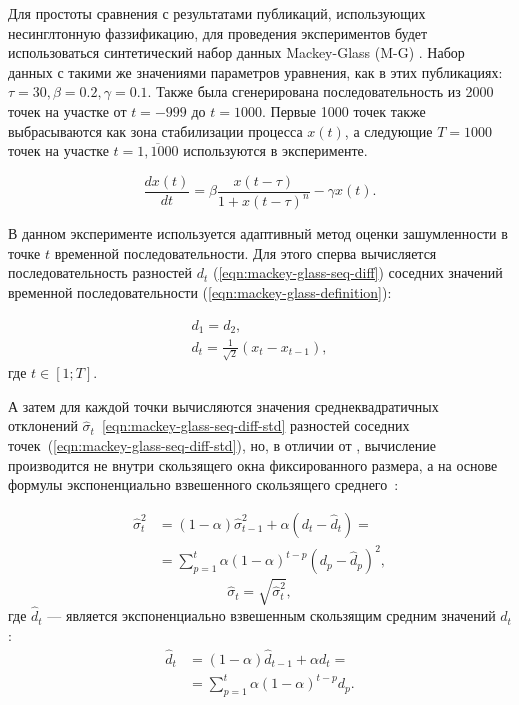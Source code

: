 Для простоты сравнения с результатами публикаций, использующих несинглтонную фаззификацию, для проведения экспериментов будет использоваться синтетический набор данных Mackey-Glass (M-G) \cite{MackeyGlass1977}. Набор данных с такими же значениями параметров уравнения, как в этих публикациях: $\tau = 30, \beta = 0.2, \gamma = 0.1$. Также была сгенерирована последовательность из 2000 точек на участке от $t=-999$ до $t=1000$. Первые 1000 точек также выбрасываются как зона стабилизации процесса $x(t)$, а следующие $T=1000$ точек на участке $t=\overline{1,1000}$ используются в эксперименте.

\begin{equation}
	\frac{dx(t)}{dt} = \beta\frac{x(t-\tau)}{1+x(t-\tau)^n}-\gamma x(t).
	\label{eqn:mackey-glass-definition}
\end{equation}


В данном эксперименте используется адаптивный метод оценки зашумленности в точке $t$ временной последовательности. Для этого сперва вычисляется последовательность разностей $d_t$ (\ref{eqn:mackey-glass-seq-diff}) соседних значений временной последовательности (\ref{eqn:mackey-glass-definition}):

\begin{equation}
	\label{eqn:mackey-glass-seq-diff}
	\begin{aligned}
	d_1 = d_2, \\
	d_t = \frac{1}{\sqrt{2}}(x_t - x_{t-1}),
	\end{aligned}
\end{equation}
где $t\in[1;T]$.

А затем для каждой точки вычисляются значения среднеквадратичных отклонений $\hat{\sigma}_t$~\eqref{eqn:mackey-glass-seq-diff-std} разностей соседних точек~(\ref{eqn:mackey-glass-seq-diff-std}), но, в отличии от \cite{Pekaslan2020}, вычисление производится не внутри скользящего окна фиксированного размера, а на основе формулы экспоненциально взвешенного скользящего среднего~\cite{OrlovEconometricsTS, NaumovTSForecasting}:

\begin{equation}
	\label{eqn:mackey-glass-seq-diff-var-iterative}
	\begin{aligned}
	\hat{\sigma}^2_t &= (1-\alpha) \hat{\sigma}^2_{t-1} + \alpha (d_t - \hat{d}_t) = \\
	&= \sum_{p=1}^t \alpha (1-\alpha)^{t-p} (d_p - \hat{d}_p)^2, 
	\end{aligned}
\end{equation}
\begin{equation}
	\label{eqn:mackey-glass-seq-diff-std}
	\hat{\sigma}_t = \sqrt{\hat{\sigma}^2_t},
\end{equation}
где $\hat{d}_t$ --- является экспоненциально взвешенным скользящим средним значений $d_t$:
\begin{equation}
	\label{eqn:mackey-glass-seq-diff-mean}
	\begin{aligned}
		\hat{d}_t &= (1-\alpha) \hat{d}_{t-1} + \alpha d_t = \\
		&= \sum_{p=1}^t \alpha (1-\alpha)^{t-p} d_p. %
	\end{aligned}
\end{equation}


